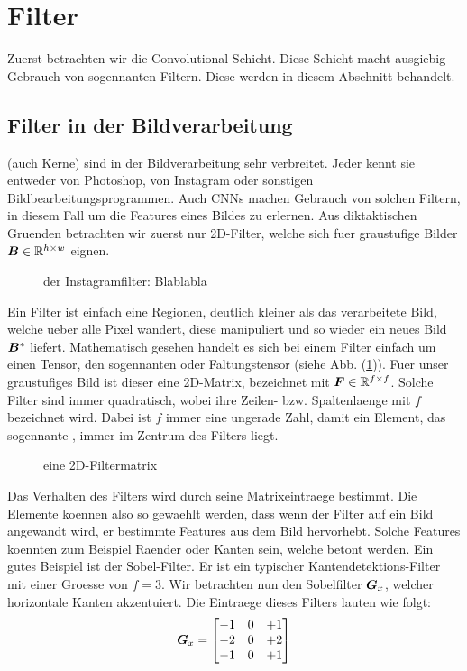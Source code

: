 \section{Filter}
Zuerst betrachten wir die Convolutional Schicht. Diese Schicht macht ausgiebig
Gebrauch von sogennanten Filtern. Diese werden in diesem Abschnitt behandelt.

\subsection{Filter in der Bildverarbeitung}
 (auch Kerne) sind in der Bildverarbeitung sehr verbreitet. Jeder kennt sie entweder
von Photoshop, von Instagram oder sonstigen Bildbearbeitungsprogrammen.
Auch CNNs machen Gebrauch von solchen Filtern, in diesem Fall um die Features eines Bildes zu
erlernen. Aus diktaktischen Gruenden betrachten wir zuerst nur 2D-Filter, welche sich fuer graustufige
Bilder $\bm{B} \in \mathbb{R}^{h \times w}$ eignen.
\begin{figure}[h!]

  \caption{der Instagramfilter: Blablabla}
\end{figure}

\para{}
Ein Filter ist einfach eine Regionen, deutlich kleiner als das verarbeitete Bild, welche
ueber alle Pixel wandert, diese manipuliert und so wieder ein neues Bild
$\bm{B}^*$ liefert.
Mathematisch gesehen handelt es sich bei einem Filter einfach um einen Tensor,
den sogennanten  oder Faltungstensor (siehe Abb.
(\ref{fig:filtermatrix})). Fuer unser graustufiges Bild ist dieser eine 2D-Matrix,
bezeichnet mit $\bm{F} \in \mathbb{R}^{f \times f}$. Solche Filter sind immer quadratisch,
wobei ihre Zeilen- bzw. Spaltenlaenge mit $f$ bezeichnet wird. Dabei ist $f$
immer eine ungerade Zahl, damit ein Element, das sogennante , immer im Zentrum des Filters liegt.

\begin{figure}[h!]
  \caption{eine 2D-Filtermatrix}
  \label{fig:filtermatrix}
\end{figure}
\para{}
Das Verhalten des Filters wird durch seine Matrixeintraege bestimmt.
Die Elemente koennen also so gewaehlt werden, dass wenn der Filter auf ein Bild
angewandt wird, er bestimmte Features aus dem Bild hervorhebt. Solche Features
koennten zum Beispiel Raender oder Kanten sein, welche betont werden.
\para{}
Ein gutes Beispiel ist der Sobel-Filter. Er ist ein typischer Kantendetektions-Filter mit einer
Groesse von $f = 3$. Wir betrachten nun den Sobelfilter $\bm{G}_x$, welcher
horizontale Kanten akzentuiert. Die Eintraege dieses Filters lauten wie folgt:
\begin{equation*}
  \bm{G}_x =
  \begin{bmatrix}
    -1 & 0 & +1 \\
    -2 & 0 & +2 \\
    -1 & 0 & +1 \\
  \end{bmatrix}
\end{equation*}

